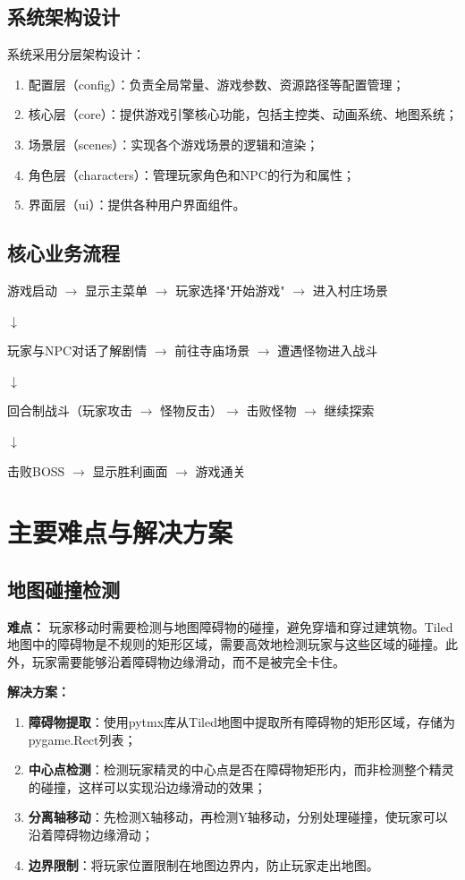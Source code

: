 \documentclass[a4paper,12pt]{article}
\begin{document}
\subsection{系统架构设计}
系统采用分层架构设计：
\begin{enumerate}[label=(\arabic*)]
    \item 配置层（config）：负责全局常量、游戏参数、资源路径等配置管理；
    \item 核心层（core）：提供游戏引擎核心功能，包括主控类、动画系统、地图系统；
    \item 场景层（scenes）：实现各个游戏场景的逻辑和渲染；
    \item 角色层（characters）：管理玩家角色和NPC的行为和属性；
    \item 界面层（ui）：提供各种用户界面组件。
\end{enumerate}

\subsection{核心业务流程}
游戏启动 $\rightarrow$ 显示主菜单 $\rightarrow$ 玩家选择"开始游戏" $\rightarrow$ 进入村庄场景

$\downarrow$

玩家与NPC对话了解剧情 $\rightarrow$ 前往寺庙场景 $\rightarrow$ 遭遇怪物进入战斗

$\downarrow$

回合制战斗（玩家攻击 $\rightarrow$ 怪物反击）$\rightarrow$ 击败怪物 $\rightarrow$ 继续探索

$\downarrow$

击败BOSS $\rightarrow$ 显示胜利画面 $\rightarrow$ 游戏通关

\section{主要难点与解决方案}

\subsection{地图碰撞检测}

\textbf{难点：}
玩家移动时需要检测与地图障碍物的碰撞，避免穿墙和穿过建筑物。Tiled地图中的障碍物是不规则的矩形区域，需要高效地检测玩家与这些区域的碰撞。此外，玩家需要能够沿着障碍物边缘滑动，而不是被完全卡住。

\textbf{解决方案：}
\begin{enumerate}[label=(\arabic*)]
    \item \textbf{障碍物提取}：使用pytmx库从Tiled地图中提取所有障碍物的矩形区域，存储为pygame.Rect列表；
    \item \textbf{中心点检测}：检测玩家精灵的中心点是否在障碍物矩形内，而非检测整个精灵的碰撞，这样可以实现沿边缘滑动的效果；
    \item \textbf{分离轴移动}：先检测X轴移动，再检测Y轴移动，分别处理碰撞，使玩家可以沿着障碍物边缘滑动；
    \item \textbf{边界限制}：将玩家位置限制在地图边界内，防止玩家走出地图。
\end{enumerate}
\end{document}
